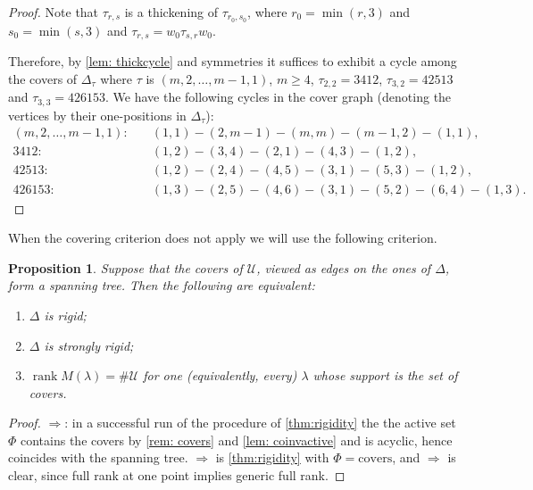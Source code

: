 \documentclass[12pt]{article}
\newtheorem{proposition}[theorem]{Proposition}
\newcommand{\U}{\mathcal{U}}
\newcommand{\rk}{\operatorname{rank}}
\newcommand{\IM}{\Delta}
\begin{document}
\begin{proof}
Note that $\tau_{r,s}$ is a thickening of $\tau_{r_0,s_0}$, where $r_0=\min(r,3)$ and $s_0=\min(s,3)$ and $\tau_{r,s}=w_0\tau_{s,r}w_0$.

Therefore, by \cref{lem: thickcycle} and symmetries it suffices to exhibit a cycle among the covers of $\IM_\tau$ where $\tau$ is
$(m,2,\dots,m-1,1)$, $m\ge4$, $\tau_{2,2}=3412$, $\tau_{3,2}=42513$ and $\tau_{3,3}=426153$. We have the following cycles in the cover graph
(denoting the vertices by their one-positions in $\IM_\tau$):
\begin{align*}
(m,2,\dots,m-1,1):&\quad (1,1)-(2,m-1)-(m,m)-(m-1,2)-(1,1),\\
3412:&\quad (1,2)-(3,4)-(2,1)-(4,3)-(1,2),\\
42513:&\quad (1,2)-(2,4)-(4,5)-(3,1)-(5,3)-(1,2),\\
426153:&\quad (1,3)-(2,5)-(4,6)-(3,1)-(5,2)-(6,4)-(1,3).
\end{align*}
\end{proof}

When the covering criterion does not apply we will use the following criterion.

\begin{proposition} \label{prop: covertree}
Suppose that the covers of $\U$, viewed as edges on the ones of $\IM$, form a spanning tree.
Then the following are equivalent:
\begin{enumerate}
\item \label{part: treerigid} $\IM$ is rigid;
\item \label{part: treestrong} $\IM$ is strongly rigid;
\item \label{part: treerank} $\rk M(\lambda)=\#\U$ for one (equivalently, every) $\lambda$ whose support is the set of covers.
\end{enumerate}
\end{proposition}

\begin{proof}
$\Rightarrow$: in a successful run of the procedure of \cref{thm:rigidity} the
the active set $\Phi$ contains the covers by \cref{rem: covers} and \cref{lem: coinvactive} and is acyclic, hence
coincides with the spanning tree. $\Rightarrow$ is \cref{thm:rigidity} with
$\Phi=\mathrm{covers}$, and $\Rightarrow$ is clear, since full rank at one point implies generic full rank.
\end{proof}
\end{document}
